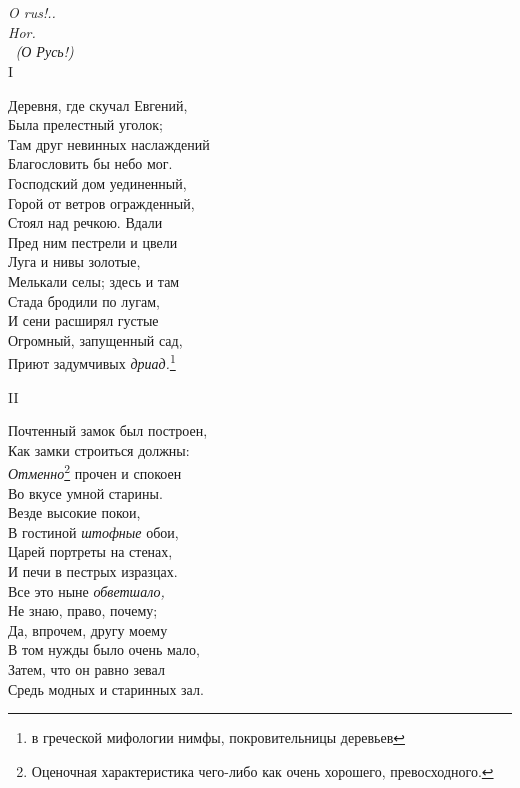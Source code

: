 \chapter{} %
\label{cap2} %

\textit{O rus!..\\
Hor.\\ 
(О Русь!)}\\

I

Деревня, где скучал Евгений,\\
Была прелестный уголок;\\
Там друг невинных наслаждений\\
Благословить бы небо мог.\\
Господский дом уединенный,\\
Горой от ветров огражденный,\\
Стоял над речкою. Вдали\\
Пред ним пестрели и цвели\\
Луга и нивы золотые,\\
Мелькали селы; здесь и там\\
Стада бродили по лугам,\\
И сени расширял густые\\
Огромный, запущенный сад,\\
Приют задумчивых \emph{дриад.}\footnote{в греческой мифологии нимфы, покровительницы деревьев}

II

Почтенный замок был построен,\\
Как замки строиться должны:\\
\emph{Отменно}\footnote{Оценочная характеристика чего-либо как очень хорошего, превосходного.} прочен и спокоен\\
Во вкусе умной старины.\\
Везде высокие покои,\\
В гостиной \emph{штофные} обои,\\
Царей портреты на стенах,\\
И печи в пестрых изразцах.\\
Все это ныне \emph{обветшало,}\\
Не знаю, право, почему;\\
Да, впрочем, другу моему\\
В том нужды было очень мало,\\
Затем, что он равно зевал\\
Средь модных и старинных зал.\\

